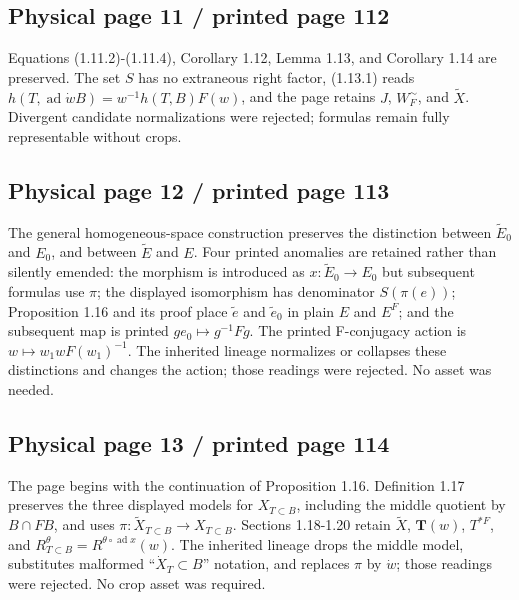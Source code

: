 \documentclass[10pt]{article}
\begin{document}
\subsection*{Physical page 11 / printed page 112}

Equations (1.11.2)-(1.11.4), Corollary 1.12, Lemma 1.13, and Corollary 1.14 are preserved. The set \(S\) has no extraneous right factor, (1.13.1) reads \(h(T,\operatorname{ad}\dot wB)=w^{-1}h(T,B)F(w)\), and the page retains \(J\), \(W_F^{\sim}\), and \(\widetilde X\). Divergent candidate normalizations were rejected; formulas remain fully representable without crops.\par

\subsection*{Physical page 12 / printed page 113}

The general homogeneous-space construction preserves the distinction between \(\widetilde E_0\) and \(E_0\), and between \(\widetilde E\) and \(E\). Four printed anomalies are retained rather than silently emended: the morphism is introduced as \(x:\widetilde E_0\to E_0\) but subsequent formulas use \(\pi\); the displayed isomorphism has denominator \(S(\pi(e))\); Proposition 1.16 and its proof place \(\widetilde e\) and \(\widetilde e_0\) in plain \(E\) and \(E^F\); and the subsequent map is printed \(ge_0\mapsto g^{-1}Fg\). The printed F-conjugacy action is \(w\mapsto w_1wF(w_1)^{-1}\). The inherited lineage normalizes or collapses these distinctions and changes the action; those readings were rejected. No asset was needed.\par

\subsection*{Physical page 13 / printed page 114}

The page begins with the continuation of Proposition 1.16. Definition 1.17 preserves the three displayed models for \(X_{T\subset B}\), including the middle quotient by \(B\cap FB\), and uses \(\pi:\widetilde X_{T\subset B}\to X_{T\subset B}\). Sections 1.18-1.20 retain \(\widetilde X\), \(\mathbf T(w)\), \(T^{*F}\), and \(R_{T\subset B}^{\theta}=R^{\theta\circ\operatorname{ad}x}(w)\). The inherited lineage drops the middle model, substitutes malformed “\(\dot X_T\subset B\)” notation, and replaces \(\pi\) by \(\dot w\); those readings were rejected. No crop asset was required.\par
\end{document}
